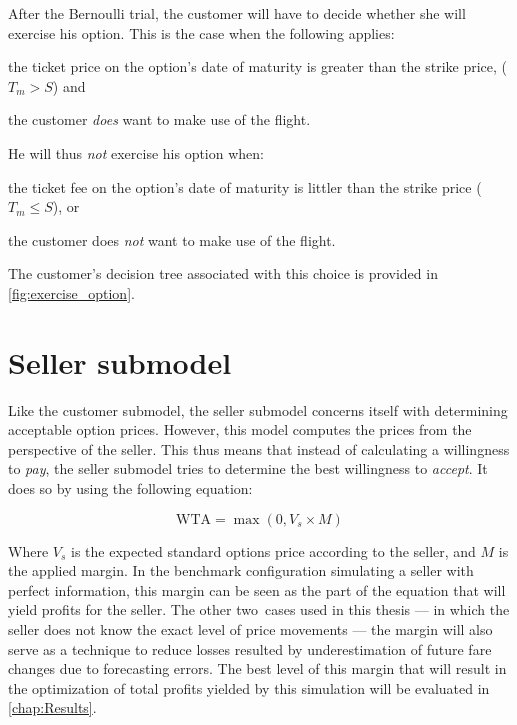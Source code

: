 After the Bernoulli trial, the customer will have to decide whether she will exercise his option. This is the case when the following applies:
\begin{compactitem}
    \item the ticket price on the option's date of maturity is greater than the strike price, ($T_m > S$) and
    \item the customer \emph{does} want to make use of the flight.
\end{compactitem}
\vspace{1em}

\noindent
He will thus \emph{not} exercise his option when:
\begin{compactitem}
    \item the ticket fee on the option's date of maturity is littler than the strike price ($T_m \le S$), or
    \item the customer does \emph{not} want to make use of the flight.
\end{compactitem}
\vspace{1em}

The customer's decision tree associated with this choice is provided in \autoref{fig:exercise_option}.





\section{Seller submodel}
\label{sec:sellerSubmodel}
Like the customer submodel, the seller submodel concerns itself with determining acceptable option prices. However, this model computes the prices from the perspective of the seller. This thus means that instead of calculating a willingness to \emph{pay}, the seller submodel tries to determine the best willingness to \emph{accept}. It does so by using the following equation:

$$ \mbox{WTA} = \max(0, V_s \times M) $$

Where $V_s$ is the expected standard options price according to the seller, and $M$ is the applied margin. In the benchmark configuration simulating a seller with perfect information, this margin can be seen as the part of the equation that will yield profits for the seller. The other two~cases used in this thesis --- in which the seller does not know the exact level of price movements --- the margin will also serve as a technique to reduce losses resulted by underestimation of future fare changes due to forecasting errors. The best level of this margin that will result in the optimization of total profits yielded by this simulation will be evaluated in \autoref{chap:Results}.


